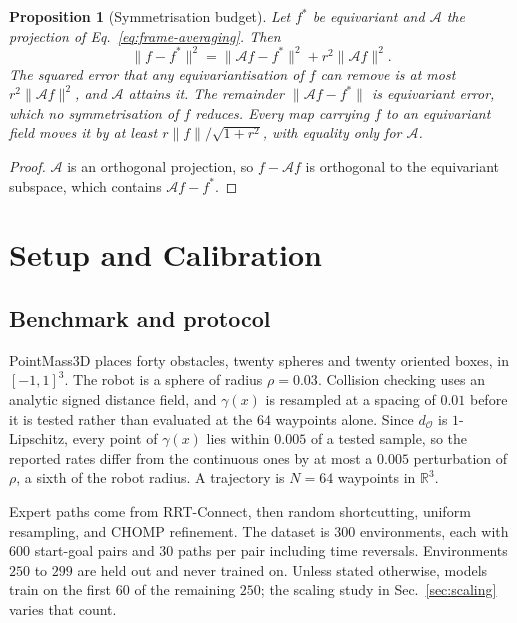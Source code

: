 \documentclass[10pt,twocolumn,letterpaper]{article}
\newtheorem{proposition}{Proposition}
\begin{document}
\begin{proposition}[Symmetrisation budget]
\label{prop:budget}
Let $f^\ast$ be equivariant and $\mathcal{A}$ the projection of
Eq.~\eqref{eq:frame-averaging}. Then
\begin{equation}
  \|f - f^\ast\|^2 = \|\mathcal{A}f - f^\ast\|^2 + r^2\|\mathcal{A}f\|^2 .
  \label{eq:budget}
\end{equation}
The squared error that any equivariantisation of $f$ can remove is at most
$r^2\|\mathcal{A}f\|^2$, and $\mathcal{A}$ attains it. The remainder
$\|\mathcal{A}f - f^\ast\|$ is equivariant error, which no symmetrisation of $f$
reduces. Every map carrying $f$ to an equivariant field moves it by at least
$r\|f\|/\sqrt{1+r^2}$, with equality only for $\mathcal{A}$.
\end{proposition}
\begin{proof}
$\mathcal{A}$ is an orthogonal projection, so $f - \mathcal{A}f$ is orthogonal to
the equivariant subspace, which contains $\mathcal{A}f - f^\ast$.
\end{proof}

\section{Setup and Calibration}
\subsection{Benchmark and protocol}

PointMass3D places forty obstacles, twenty spheres and twenty oriented boxes, in
$[-1,1]^3$. The robot is a sphere of radius $\rho = 0.03$. Collision checking uses an
analytic signed distance field, and $\gamma(x)$ is resampled at a spacing of
$0.01$ before it is tested rather than evaluated at the $64$ waypoints alone.
Since $d_{\mathcal{O}}$ is $1$-Lipschitz, every point of $\gamma(x)$ lies within
$0.005$ of a tested sample, so the reported rates differ from the continuous ones
by at most a $0.005$ perturbation of $\rho$, a sixth of the robot radius. A trajectory
is $N=64$ waypoints in $\mathbb{R}^3$.

Expert paths come from RRT-Connect, then random shortcutting, uniform
resampling, and CHOMP refinement. The dataset is $300$ environments, each with
$600$ start-goal pairs and $30$ paths per pair including time reversals.
Environments $250$ to $299$ are held out and never trained on. Unless stated
otherwise, models train on the first $60$ of the remaining $250$; the scaling
study in Sec.~\ref{sec:scaling} varies that count.
\end{document}
